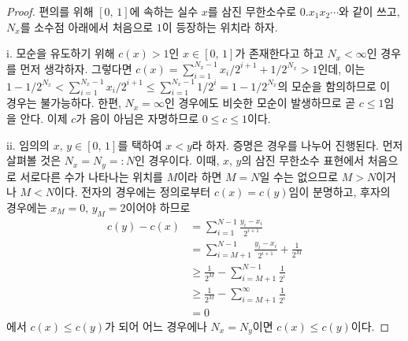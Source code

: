 \begin{proof}
    편의를 위해 $[0,\,1]$에 속하는 실수 $x$를 삼진 무한소수로 $0.x_1x_2\cdots$와 같이 쓰고, $N_x$를 소수점 아래에서 처음으로 $1$이 등장하는 위치라 하자.

    i. 모순을 유도하기 위해 $c(x)>1$인 $x\in[0,\,1]$가 존재한다고 하고 $N_x<\infty$인 경우를 먼저 생각하자. 그렇다면 $c(x)=\sum_{i=1}^{N_x-1}x_i/2^{i+1}+1/2^{N_x}>1$인데, 이는 $1-1/2^{N_x}<\sum_{i=1}^{N_x-1}x_i/2^{i+1}\leq\sum_{i=1}^{N_x-1}1/2^i=1-1/2^{N_x}$의 모순을 함의하므로 이 경우는 불가능하다. 한편, $N_x=\infty$인 경우에도 비슷한 모순이 발생하므로 곧 $c\leq1$임을 안다. 이제 $c$가 음이 아님은 자명하므로 $0\leq c\leq1$이다.

    ii. 임의의 $x,\,y\in[0,\,1]$를 택하여 $x<y$라 하자. 증명은 경우를 나누어 진행된다. 먼저 살펴볼 것은 $N_x=N_y=:N$인 경우이다. 이때, $x,\,y$의 삼진 무한소수 표현에서 처음으로 서로다른 수가 나타나는 위치를 $M$이라 하면 $M=N$일 수는 없으므로 $M>N$이거나 $M<N$이다. 전자의 경우에는 정의로부터 $c(x)=c(y)$임이 분명하고, 후자의 경우에는 $x_M=0,\,y_M=2$이어야 하므로
    \begin{align*}
        c(y)-c(x)&=\sum_{i=1}^{N-1}\frac{y_i-x_i}{2^{i+1}}\\
        &=\sum_{i=M+1}^{N-1}\frac{y_i-x_i}{2^{i+1}}+\frac{1}{2^M}\\
        &\geq\frac{1}{2^M}-\sum_{i=M+1}^{N-1}\frac{1}{2^i}\\
        &\geq\frac{1}{2^M}-\sum_{i=M+1}^\infty\frac{1}{2^i}\\
        &=0
    \end{align*}
    에서 $c(x)\leq c(y)$가 되어 어느 경우에나 $N_x=N_y$이면 $c(x)\leq c(y)$이다.


\end{proof}
